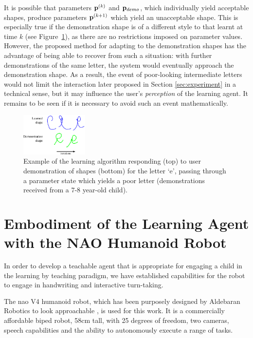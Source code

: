 \documentclass{sig-alternate}
\begin{document}
It is possible that parameters ${\bf p}^{(k)}$ and ${\bf p}_{demo}$, which
individually yield acceptable shapes, produce parameters ${\bf p}^{(k+1)}$
which yield an unacceptable shape. This is especially true if the demonstration
shape is of a different style to that learnt at time $k$ (see 
Figure~\ref{fig:eDemo}), as there are no
restrictions imposed on parameter values. However, the proposed method for adapting to
the demonstration shapes has the advantage of being able to recover from such a situation: with further
demonstrations of the same letter, the system would eventually approach the
demonstration shape. As a result, the event of poor-looking 
intermediate letters
would not limit the interaction later proposed in Section \ref{sec:experiment}
in a technical sense, but it may influence the user's \emph{perception} of the learning
agent. It remains to be seen if it is necessary to avoid such an event
mathematically.

\begin{figure}[thpb]
    \centering
    \includegraphics[width=0.3\textwidth]{figures/learningEdemo}
    \caption{\label{fig:eDemo}Example of the learning algorithm
    responding (top) to user demonstration of shapes (bottom) for the letter `e', passing through a parameter state which yields a poor letter (demonstrations received from a 7-8 year-old child).}
\end{figure}



\section{Embodiment of the Learning Agent with the NAO Humanoid Robot}
\label{sec:robotWriting}

In order to develop a teachable agent that is appropriate for engaging a child
in the learning by teaching paradigm, we have established capabilities for the robot 
to engage in handwriting and interactive turn-taking.

The {\sc nao} V4 humanoid robot, which has been purposely designed by 
Aldebaran Robotics to look approachable \cite{Gouaillier2008}, is used for
this work. It is a commercially affordable biped robot, 58cm tall, with 25
degrees of freedom, two cameras, speech capabilities and the ability to
autonomously execute a range of tasks.
\end{document}
